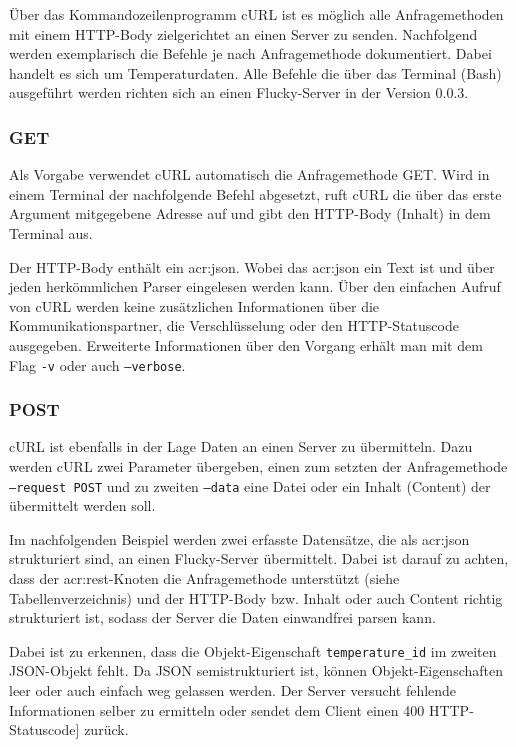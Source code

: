 Über das Kommandozeilenprogramm cURL ist es möglich alle Anfragemethoden mit einem HTTP-Body zielgerichtet an einen Server zu senden. Nachfolgend werden exemplarisch die Befehle je nach Anfragemethode dokumentiert. Dabei handelt es sich um Temperaturdaten. Alle Befehle die über das Terminal (Bash) ausgeführt werden richten sich an einen Flucky-Server in der Version 0.0.3.

\subsubsection{GET}%
\label{sec:rest.ansteuern.get}
Als Vorgabe verwendet cURL automatisch die Anfragemethode GET. Wird in einem Terminal der nachfolgende Befehl abgesetzt, ruft cURL die über das erste Argument mitgegebene Adresse auf und gibt den HTTP-Body (Inhalt) in dem Terminal aus.


Der HTTP-Body enthält ein \acrshort{acr:json}. Wobei das \acrshort{acr:json} ein Text ist und über jeden herkömmlichen Parser eingelesen werden kann. Über den einfachen Aufruf von cURL werden keine zusätzlichen Informationen über die Kommunikationspartner, die Verschlüsselung oder den HTTP-Statuscode ausgegeben. Erweiterte Informationen über den Vorgang erhält man mit dem Flag \texttt{-v} oder auch \texttt{--verbose}.

\subsubsection{POST}%
\label{sec:rest.ansteuern.post}
cURL ist ebenfalls in der Lage Daten an einen Server zu übermitteln. Dazu werden cURL zwei Parameter übergeben, einen zum setzten der Anfragemethode \texttt{--request POST} und zu zweiten \texttt{--data} eine Datei oder ein Inhalt (Content) der übermittelt werden soll.

Im nachfolgenden Beispiel werden zwei erfasste Datensätze, die als \acrshort{acr:json} strukturiert sind, an einen Flucky-Server übermittelt. Dabei ist darauf zu achten, dass der \acrshort{acr:rest}-Knoten die Anfragemethode unterstützt (siehe Tabellenverzeichnis) und der HTTP-Body bzw. Inhalt oder auch Content richtig strukturiert ist, sodass der Server die Daten einwandfrei parsen kann.


Dabei ist zu erkennen, dass die Objekt-Eigenschaft \texttt{temperature\_id} im zweiten JSON-Objekt fehlt. Da JSON semistrukturiert ist, können Objekt-Eigenschaften leer oder auch einfach weg gelassen werden. Der Server versucht fehlende Informationen selber zu ermitteln oder sendet dem Client einen 400 HTTP-Statuscode] zurück.

